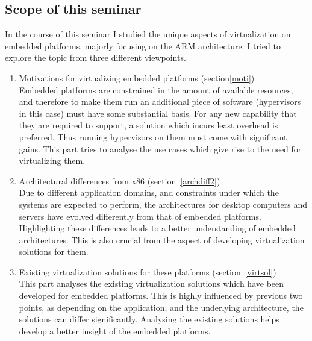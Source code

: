 \documentclass[seminar,twoside]{iitbreport}
\begin{document}
\subsection{Scope of this seminar}
In the course of this seminar I studied the unique aspects of virtualization on embedded platforms, majorly focusing on the ARM architecture.
I tried to explore the topic from three different viewpoints. 
\begin{enumerate}
\item Motivations for virtualizing embedded platforms (section\ref{moti})\\
 Embedded platforms are constrained in the amount of available resources, and therefore to make them run an additional piece of software (hypervisors in this case) must have some 
 substantial basis. For any new capability that they are required to support, a solution which incurs least overhead is preferred. Thus running hypervisors on
 them must come with significant gains.
 This part tries to analyse the use cases which give rise to the need for virtualizing them.
 \item Architectural differences from x86 (section~\ref{archdiff2})\\
 Due to different application domains, and constraints under which the systems are expected to perform, the architectures for desktop computers and servers have evolved
 differently from that of embedded platforms. Highlighting these differences leads to a better understanding of embedded architectures. This is also crucial from the 
 aspect of developing virtualization solutions for them.
 \item Existing virtualization solutions for these platforms (section~\ref{virtsol})\\
 This part analyses the existing virtualization solutions which have been developed for embedded platforms. This is highly influenced by previous two points, as depending on
 the application, and the underlying architecture, the solutions can differ significantly. Analysing the existing solutions helps develop a better insight of the embedded platforms.
\end{enumerate}


\end{document}
